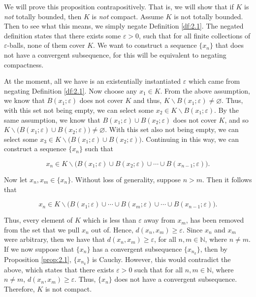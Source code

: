 \documentclass{article}
\makeatletter
\theoremstyle{definition}
\theoremstyle{remark}
\let\oldproofname=\proofname
\renewcommand{\proofname}{\bf{\textit{\oldproofname}}}
\theoremstyle{definition}
\renewenvironment{proof}[1][\proofname]{\par
  \pushQED{\qed}%
  \normalfont \topsep6\p@\@plus6\p@\relax
  \list{}{\leftmargin=0mm
          \rightmargin=0mm
          \settowidth{\itemindent}{\itshape#1}%
          \labelwidth=\itemindent
          \parsep=0pt \listparindent=0mm%
  }
  \item[\hskip\labelsep
        \itshape
    #1\@addpunct{.}]\ignorespaces
}{%
  \popQED\endlist\@endpefalse
}
\makeatother
\begin{document}
\begin{proof}
    We will prove this proposition contrapositively. That is, we will show that if $K$ is \textit{not} totally bounded, then $K$ is \textit{not} compact. Assume $K$ is not totally bounded. Then to see what this means, we simply negate Definition \ref{df:2.1}. The negated definition states that there exists some $\varepsilon>0$, such that for all finite collections of $\varepsilon$-balls, none of them cover $K$. We want to construct a sequence $\{x_n\}$ that does not have a convergent subsequence, for this will be equivalent to negating compactness.\par\hspace{4mm} At the moment, all we have is an existentially instantiated $\varepsilon$ which came from negating Definition \ref{df:2.1}. Now choose any $x_1\in K$. From the above assumption, we know that $B(x_1;\varepsilon)$ does not cover $K$ and thus, $K\backslash B(x_1;\varepsilon)\neq\varnothing$. Thus, with this set not being empty, we can select some $x_2\in K\backslash B(x_1;\varepsilon)$. By the same assumption, we know that $B(x_1;\varepsilon)\cup B(x_2;\varepsilon)$ does not cover $K$, and so $K\backslash\big(B(x_1;\varepsilon)\cup B(x_2;\varepsilon)\big)\neq\varnothing$. With this set also not being empty, we can select some $x_3\in K\backslash\big(B(x_1;\varepsilon)\cup B(x_2;\varepsilon)\big)$. Continuing in this way, we can construct a sequence $\{x_n\}$ such that 
    
    \begin{equation*}
        x_n\in K\backslash\big(B(x_1;\varepsilon)\cup B(x_2;\varepsilon)\cup\cdots\cup B(x_{n-1};\varepsilon)\big).
    \end{equation*}
    
    Now let $x_n,x_m\in\{x_n\}$. Without loss of generality, suppose $n>m$. Then it follows that 
    
    \begin{equation*}
        x_n\in K\backslash\big(B(x_1;\varepsilon)\cup\cdots\cup B(x_m;\varepsilon)\cup\cdots\cup B(x_{n-1};\varepsilon)\big).
    \end{equation*}
    
    Thus, every element of $K$ which is less than $\varepsilon$ away from $x_m$, has been removed from the set that we pull $x_n$ out of. Hence, $d(x_n,x_m)\geq\varepsilon$. Since $x_n$ and $x_m$ were arbitrary, then we have that $d(x_n,x_m)\geq\varepsilon$, for all $n,m\in\mathbb{N}$, where $n\neq m$. If we now suppose that $\{x_n\}$ has a convergent subsequence $\{x_{n_k}\}$, then by Proposition \ref{prop:2.1}, $\{x_{n_k}\}$ is Cauchy. However, this would contradict the above, which states that there exists $\varepsilon>0$ such that for all $n,m\in\mathbb{N}$, where $n\neq m$, $d(x_n,x_m)\geq\varepsilon$. Thus, $\{x_n\}$ does not have a convergent subsequence. Therefore, $K$ is not compact. 
\end{proof}
\end{document}
